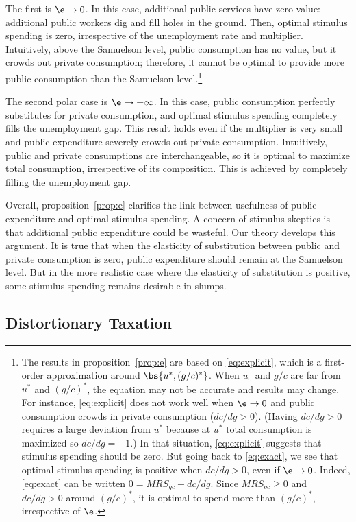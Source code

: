 \documentclass[letterpaper,12pt,leqno]{article}
\begin{document}
\begin{bibunit}
The first is $\e\to0$. In this case, additional public services have zero value: additional public workers dig and fill holes in the ground. Then, optimal stimulus spending is zero, irrespective of the unemployment rate and multiplier. Intuitively, above the Samuelson level, public consumption has no value, but it crowds out private consumption; therefore, it cannot be optimal to provide more public consumption than the Samuelson level.\footnote{The results in proposition~\ref{prop:e} are based on \eqref{eq:explicit}, which is a first-order approximation around $\bs{u^*,(g/c)^*}$. When $u_0$ and $g/c$ are far from $u^*$ and $(g/c)^*$, the equation may not be accurate and results may change. For instance, \eqref{eq:explicit} does not work well when $\e\to 0$ and public consumption crowds in private consumption ($dc/dg>0$). (Having $dc/dg>0$ requires a large deviation from $u^*$ because at $u^*$ total consumption is maximized so $dc/dg = -1$.) In that situation, \eqref{eq:explicit} suggests that stimulus spending should be zero. But going back to \eqref{eq:exact}, we see that optimal stimulus spending is positive when $dc/dg>0$, even if $\e\to 0$. Indeed, \eqref{eq:exact} can be written $0 = MRS_{gc} + dc/dg$. Since $MRS_{gc} \geq 0$ and $dc/dg>0$ around $(g/c)^*$, it is optimal to spend more than $(g/c)^*$, irrespective of $\e$.}
 
The second polar case is $\e\to+\infty$. In this case, public consumption perfectly substitutes for private consumption, and optimal stimulus spending completely fills the unemployment gap. This result holds even if the multiplier is very small and public expenditure severely crowds out private consumption. Intuitively, public and private consumptions are interchangeable, so it is optimal to maximize total consumption, irrespective of its composition. This is achieved by completely filling the unemployment gap.

Overall, proposition~\ref{prop:e} clarifies the link between usefulness of public expenditure and optimal stimulus spending. A concern of stimulus skeptics is that additional public expenditure could be wasteful. Our theory develops this argument. It is true that when the elasticity of substitution between public and private consumption is zero, public expenditure should remain at the Samuelson level. But in the more realistic case where the elasticity of substitution is positive, some stimulus spending remains  desirable in slumps.

\subsection{Distortionary Taxation}\label{sec:supply}


\end{bibunit}
\end{document}
